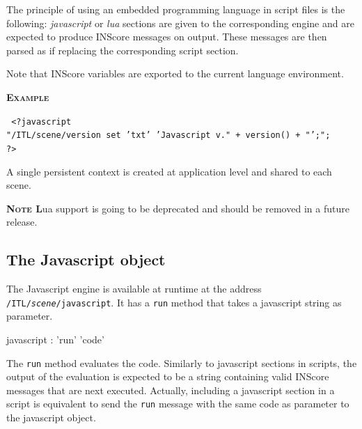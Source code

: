 \documentclass[a4paper,twoside]{report}
\newcommand{\subsublevel}[1]	{\subsection{#1}}
\newcommand{\OSC}[1]		{\texttt{#1}}
\newcommand{\example}		{\textbf{\hspace{-1.5cm}\textbf{\textsc{Example }}}}
\newcommand{\note}	[1]		{\vspace{2mm}\textbf{\hspace{-0.9cm}\textbf{\textsc{Note #1}}}}
\newcommand{\sample}	[1]			{\vspace{-2mm}\begin{center}\colorbox{mygrey}{
								\begin{minipage}[t]{0.9\columnwidth} 
								{\small \texttt{#1}}
								\end{minipage}}\end{center}}
\begin{document}
The principle of using an embedded programming language in script files is the following: \emph{javascript} or \emph{lua} sections are given to the corresponding engine and are expected to produce INScore messages on output.
These messages are then parsed as if replacing the corresponding script section.

Note that INScore variables are exported to the current language environment.

\example
\sample{
<?javascript \\
\hspace*{3mm} "/ITL/scene/version set 'txt' 'Javascript v."  + version() + "';"; \\
\hspace*{1mm} ?>
}

A single persistent context is created at application level and shared to each scene.

\note Lua support is going to be deprecated and should be removed in a future release.

\subsublevel{The Javascript object}\label{jsobj}

The Javascript engine is available at runtime at the address \OSC{/ITL/\textit{scene}/javascript}. It has a \OSC{run} method that takes a javascript string as parameter.

\begin{rail} 
javascript :  'run' 'code'
\end{rail}

The \OSC{run} method evaluates the code. Similarly to javascript sections in scripts, the output of the evaluation is expected to be a string containing valid INScore messages that are next executed. 
Actually, including a javascript section in a script is equivalent to send the \OSC{run} message with the same code as parameter to the javascript object.
\end{document}

